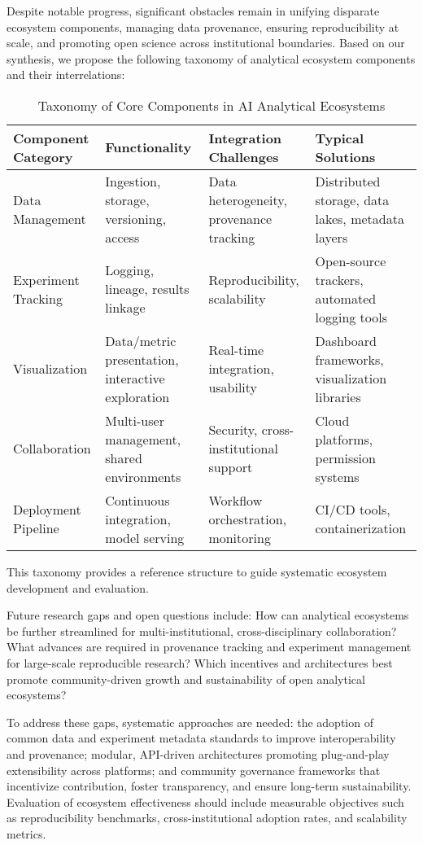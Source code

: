\documentclass[sigconf]{acmart}
\begin{document}
Despite notable progress, significant obstacles remain in unifying disparate ecosystem components, managing data provenance, ensuring reproducibility at scale, and promoting open science across institutional boundaries. Based on our synthesis, we propose the following taxonomy of analytical ecosystem components and their interrelations:

\begin{table*}[htbp]
\centering
\caption{Taxonomy of Core Components in AI Analytical Ecosystems}
\label{tab:ecosystem-taxonomy}
\begin{adjustbox}{max width=\textwidth}
\begin{tabular}{@{}llll@{}}
\toprule
Component Category & Functionality & Integration Challenges & Typical Solutions \\ 
\midrule
Data Management & Ingestion, storage, versioning, access & Data heterogeneity, provenance tracking & Distributed storage, data lakes, metadata layers \\
Experiment Tracking & Logging, lineage, results linkage & Reproducibility, scalability & Open-source trackers, automated logging tools \\
Visualization & Data/metric presentation, interactive exploration & Real-time integration, usability & Dashboard frameworks, visualization libraries \\
Collaboration & Multi-user management, shared environments & Security, cross-institutional support & Cloud platforms, permission systems \\
Deployment Pipeline & Continuous integration, model serving & Workflow orchestration, monitoring & CI/CD tools, containerization \\
\bottomrule
\end{tabular}
\end{adjustbox}
\end{table*}

This taxonomy provides a reference structure to guide systematic ecosystem development and evaluation.

Future research gaps and open questions include:
How can analytical ecosystems be further streamlined for multi-institutional, cross-disciplinary collaboration?
What advances are required in provenance tracking and experiment management for large-scale reproducible research?
Which incentives and architectures best promote community-driven growth and sustainability of open analytical ecosystems?

To address these gaps, systematic approaches are needed: the adoption of common data and experiment metadata standards to improve interoperability and provenance; modular, API-driven architectures promoting plug-and-play extensibility across platforms; and community governance frameworks that incentivize contribution, foster transparency, and ensure long-term sustainability. Evaluation of ecosystem effectiveness should include measurable objectives such as reproducibility benchmarks, cross-institutional adoption rates, and scalability metrics.
\end{document}
